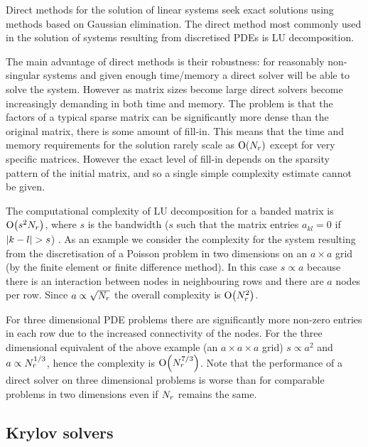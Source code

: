 Direct methods for the solution of linear systems seek exact solutions using methods based on Gaussian elimination.
The direct method most commonly used in the solution of systems resulting from discretised PDEs is LU decomposition.

The main advantage of direct methods is their robustness: for reasonably non-singular systems and given enough time/memory a direct solver will be able to solve the system.
However as matrix sizes become large direct solvers become increasingly demanding in both time and memory.
The problem is that the factors of a typical sparse matrix can be significantly more dense than the original matrix, \ie there is some amount of fill-in.
This means that the time and memory requirements for the solution rarely scale as $\mathrm{O}{\left( N_r \right)}$ except for very specific matrices.
However the exact level of fill-in depends on the sparsity pattern of the initial matrix, and so a single simple complexity estimate cannot be given.

The computational complexity of LU decomposition for a banded matrix is $\mathrm{O}{\left( s^2 N_r \right)}$, where $s$ is the bandwidth (\ie $s$ such that the matrix entries $a_{kl} = 0$ if $\left|{k - l} \right| > s$) \cite[236]{Iserles2009}.
As an example we consider the complexity for the system resulting from the discretisation of a Poisson problem in two dimensions on an $a \times a$ grid (by the finite element or finite difference method).
In this case $s \propto a$ because there is an interaction between nodes in neighbouring rows and there are $a$ nodes per row.
Since $a \propto \sqrt{N_r}$ the overall complexity is $\mathrm{O}{\left( N_r^2 \right)}$.

For three dimensional PDE problems there are significantly more non-zero entries in each row due to the increased connectivity of the nodes.
For the three dimensional equivalent of the above example (an $a \times a \times a$ grid) $s \propto a^2$ and $a \propto N_r^{1/3}$, hence the complexity is $\mathrm{O}{\left( N_r^{7/3} \right)}$.
Note that the performance of a direct solver on three dimensional problems is worse than for comparable problems in two dimensions even if $N_r$ remains the same.


\subsection{Krylov solvers}
\label{sec:krylov-solvers}


